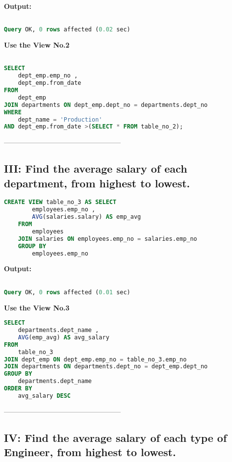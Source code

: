 \documentclass[12pt]{report}
\begin{document}
\textbf{Output:}

\begin{lstlisting}[language=sql]

Query OK, 0 rows affected (0.02 sec)

\end{lstlisting}

\textbf{Use the View No.2}
\begin{lstlisting}[language=sql]

SELECT
	dept_emp.emp_no ,
	dept_emp.from_date
FROM
	dept_emp
JOIN departments ON dept_emp.dept_no = departments.dept_no
WHERE
	dept_name = 'Production'
AND dept_emp.from_date >(SELECT * FROM table_no_2);

\end{lstlisting}

---------------------------------------------------


\subsection*{III: Find the average salary of each department, from highest to lowest.}

\begin{lstlisting}[language=sql]
CREATE VIEW table_no_3 AS SELECT
		employees.emp_no ,
		AVG(salaries.salary) AS emp_avg
	FROM
		employees
	JOIN salaries ON employees.emp_no = salaries.emp_no
	GROUP BY
		employees.emp_no
\end{lstlisting}


\textbf{Output:}
\begin{lstlisting}[language=sql]

Query OK, 0 rows affected (0.01 sec)

\end{lstlisting}

\textbf{Use the View No.3}
\begin{lstlisting}[language=sql]
SELECT
	departments.dept_name ,
	AVG(emp_avg) AS avg_salary
FROM
	table_no_3
JOIN dept_emp ON dept_emp.emp_no = table_no_3.emp_no
JOIN departments ON departments.dept_no = dept_emp.dept_no
GROUP BY
	departments.dept_name
ORDER BY
	avg_salary DESC
\end{lstlisting}

---------------------------------------------------

\subsection*{IV: Find the average salary of each type of Engineer, from highest to lowest.}
\end{document}
